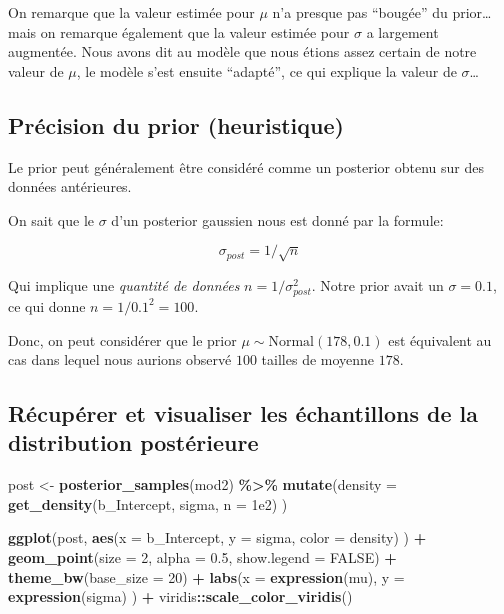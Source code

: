 \documentclass[
  a4paper,11pt,twoside,onecolumn,openright,final,oldfontcommands]{memoir}
\newenvironment{Shaded}{\begin{snugshade}}{\end{snugshade}}
\newcommand{\DataTypeTok}[1]{\textcolor[rgb]{0.13,0.29,0.53}{#1}}
\newcommand{\DecValTok}[1]{\textcolor[rgb]{0.00,0.00,0.81}{#1}}
\newcommand{\FloatTok}[1]{\textcolor[rgb]{0.00,0.00,0.81}{#1}}
\newcommand{\KeywordTok}[1]{\textcolor[rgb]{0.13,0.29,0.53}{\textbf{#1}}}
\newcommand{\NormalTok}[1]{#1}
\newcommand{\OperatorTok}[1]{\textcolor[rgb]{0.81,0.36,0.00}{\textbf{#1}}}
\newcommand{\OtherTok}[1]{\textcolor[rgb]{0.56,0.35,0.01}{#1}}
\newcommand{\StringTok}[1]{\textcolor[rgb]{0.31,0.60,0.02}{#1}}
\theoremstyle{definition}
\theoremstyle{definition}
\theoremstyle{definition}
\theoremstyle{remark}
\begin{document}
On remarque que la valeur estimée pour \(\mu\) n'a presque pas ``bougée'' du prior\ldots mais on remarque également que la valeur estimée pour \(\sigma\) a largement augmentée. Nous avons dit au modèle que nous étions assez certain de notre valeur de \(\mu\), le modèle s'est ensuite ``adapté'', ce qui explique la valeur de \(\sigma\)\ldots{}

\hypertarget{pruxe9cision-du-prior-heuristique}{%
\subsection{Précision du prior (heuristique)}\label{pruxe9cision-du-prior-heuristique}}

Le prior peut généralement être considéré comme un posterior obtenu sur des données antérieures.

On sait que le \(\sigma\) d'un posterior gaussien nous est donné par la formule:

\[\sigma_{post} = 1 / \sqrt{n}\]

Qui implique une \emph{quantité de données} \(n = 1 / \sigma^2_{post}\). Notre prior avait un \(\sigma = 0.1\), ce qui donne \(n = 1 / 0.1^2 = 100\).

Donc, on peut considérer que le prior \(\mu \sim \mathrm{Normal}(178, 0.1)\) est équivalent au cas dans lequel nous aurions observé \(100\) tailles de moyenne \(178\).

\hypertarget{ruxe9cupuxe9rer-et-visualiser-les-uxe9chantillons-de-la-distribution-postuxe9rieure}{%
\subsection{Récupérer et visualiser les échantillons de la distribution postérieure}\label{ruxe9cupuxe9rer-et-visualiser-les-uxe9chantillons-de-la-distribution-postuxe9rieure}}

\begin{Shaded}
\begin{Highlighting}[]
\NormalTok{post \textless{}{-}}\StringTok{ }\KeywordTok{posterior\_samples}\NormalTok{(mod2) }\OperatorTok{\%\textgreater{}\%}
\StringTok{    }\KeywordTok{mutate}\NormalTok{(}\DataTypeTok{density =} \KeywordTok{get\_density}\NormalTok{(b\_Intercept, sigma, }\DataTypeTok{n =} \FloatTok{1e2}\NormalTok{) )}

\KeywordTok{ggplot}\NormalTok{(post, }\KeywordTok{aes}\NormalTok{(}\DataTypeTok{x =}\NormalTok{ b\_Intercept, }\DataTypeTok{y =}\NormalTok{ sigma, }\DataTypeTok{color =}\NormalTok{ density) ) }\OperatorTok{+}
\StringTok{    }\KeywordTok{geom\_point}\NormalTok{(}\DataTypeTok{size =} \DecValTok{2}\NormalTok{, }\DataTypeTok{alpha =} \FloatTok{0.5}\NormalTok{, }\DataTypeTok{show.legend =} \OtherTok{FALSE}\NormalTok{) }\OperatorTok{+}
\StringTok{    }\KeywordTok{theme\_bw}\NormalTok{(}\DataTypeTok{base\_size =} \DecValTok{20}\NormalTok{) }\OperatorTok{+}
\StringTok{    }\KeywordTok{labs}\NormalTok{(}\DataTypeTok{x =} \KeywordTok{expression}\NormalTok{(mu), }\DataTypeTok{y =} \KeywordTok{expression}\NormalTok{(sigma) ) }\OperatorTok{+}
\StringTok{    }\NormalTok{viridis}\OperatorTok{::}\KeywordTok{scale\_color\_viridis}\NormalTok{()}
\end{Highlighting}
\end{Shaded}
\end{document}
